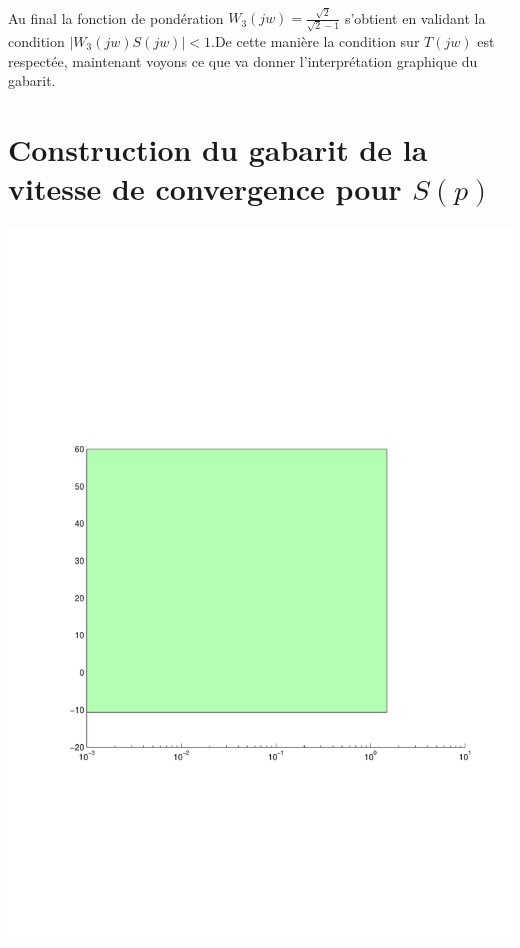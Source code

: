 \documentclass[12pt, a4paper, openany]{report}
\begin{document}
 \paragraph{}
 Au final la fonction de pondération $W_{3}(jw)=\frac{\sqrt{2}}{\sqrt{2}-1}$ \hspace{1mm} s'obtient en validant la condition $|W_{3}(jw)S(jw)|<1.$\hspace{1mm}De cette manière la condition sur $T(jw)$ est respectée, maintenant voyons ce que va donner l'interprétation graphique du gabarit.\\
 
 \section{Construction du gabarit de la vitesse de convergence pour $S(p)$} 
 
  \begin{center}
    \includegraphics[scale=0.5]{gabarit2.pdf}
    \label{fig6}
  \end{center}
  
\end{document}
